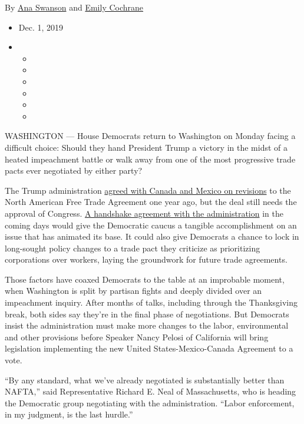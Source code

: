 By \href{https://www.nytimes3xbfgragh.onion/by/ana-swanson}{Ana Swanson}
and \href{https://www.nytimes3xbfgragh.onion/by/emily-cochrane}{Emily
Cochrane}

\begin{itemize}
\item
  Dec. 1, 2019
\item
  \begin{itemize}
  \item
  \item
  \item
  \item
  \item
  \item
  \end{itemize}
\end{itemize}

WASHINGTON --- House Democrats return to Washington on Monday facing a
difficult choice: Should they hand President Trump a victory in the
midst of a heated impeachment battle or walk away from one of the most
progressive trade pacts ever negotiated by either party?

The Trump administration
\href{https://www.nytimes3xbfgragh.onion/2018/11/30/world/americas/trump-trudeau-canada-mexico.html}{agreed
with Canada and Mexico on revisions} to the North American Free Trade
Agreement one year ago, but the deal still needs the approval of
Congress.
\href{https://www.nytimes3xbfgragh.onion/2019/12/10/us/politics/trump-aides-and-democrats-strike-deal-on-north-american-trade-pact.html}{A
handshake agreement with the administration} in the coming days would
give the Democratic caucus a tangible accomplishment on an issue that
has animated its base. It could also give Democrats a chance to lock in
long-sought policy changes to a trade pact they criticize as
prioritizing corporations over workers, laying the groundwork for future
trade agreements.

Those factors have coaxed Democrats to the table at an improbable
moment, when Washington is split by partisan fights and deeply divided
over an impeachment inquiry. After months of talks, including through
the Thanksgiving break, both sides say they're in the final phase of
negotiations. But Democrats insist the administration must make more
changes to the labor, environmental and other provisions before Speaker
Nancy Pelosi of California will bring legislation implementing the new
United States-Mexico-Canada Agreement to a vote.

``By any standard, what we've already negotiated is substantially better
than NAFTA,'' said Representative Richard E. Neal of Massachusetts, who
is heading the Democratic group negotiating with the administration.
``Labor enforcement, in my judgment, is the last hurdle.''

